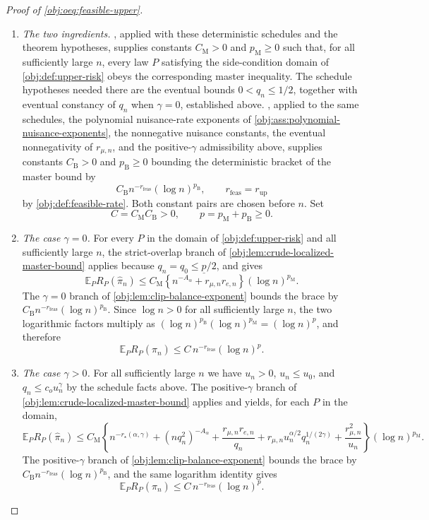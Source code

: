 \begin{proof}[Proof of \cref{obj:oeq:feasible-upper}]
\begin{enumerate}
\item \emph{The two ingredients.}  , applied with these deterministic schedules and the theorem hypotheses, supplies constants \(C_{\mathrm M}>0\) and \(p_{\mathrm M}\ge0\) such that, for all sufficiently large \(n\), every law \(P\) satisfying the side-condition domain of \cref{obj:def:upper-risk} obeys the corresponding master inequality.  The schedule hypotheses needed there are the eventual bounds \(0<q_n\le1/2\), together with eventual constancy of \(q_n\) when \(\gamma=0\), established above.  , applied to the same schedules, the polynomial nuisance-rate exponents of \cref{obj:ass:polynomial-nuisance-exponents}, the nonnegative nuisance constants, the eventual nonnegativity of \(r_{\mu,n}\), and the positive-\(\gamma\) admissibility above, supplies constants \(C_{\mathrm B}>0\) and \(p_{\mathrm B}\ge0\) bounding the deterministic bracket of the master bound by
\[
C_{\mathrm B}n^{-r_{\mathrm{feas}}}(\log n)^{p_{\mathrm B}},
\qquad
r_{\mathrm{feas}}=r_{\mathrm{up}}
\]
by \cref{obj:def:feasible-rate}.  Both constant pairs are chosen before \(n\).  Set
\[
C=C_{\mathrm M}C_{\mathrm B}>0,
\qquad
p=p_{\mathrm M}+p_{\mathrm B}\ge0 .
\]

\item \emph{The case \(\gamma=0\).}  For every \(P\) in the domain of \cref{obj:def:upper-risk} and all sufficiently large \(n\), the strict-overlap branch of \cref{obj:lem:crude-localized-master-bound} applies because \(q_n=q_0\le\underline p/2\), and gives
\[
\mathbb E_P R_P(\widehat\pi_n)
\le
C_{\mathrm M}\left\{n^{-A_\alpha}+r_{\mu,n}r_{e,n}\right\}(\log n)^{p_{\mathrm M}} .
\]
The \(\gamma=0\) branch of \cref{obj:lem:clip-balance-exponent} bounds the brace by \(C_{\mathrm B}n^{-r_{\mathrm{feas}}}(\log n)^{p_{\mathrm B}}\).  Since \(\log n>0\) for all sufficiently large \(n\), the two logarithmic factors multiply as \((\log n)^{p_{\mathrm B}}(\log n)^{p_{\mathrm M}}=(\log n)^{p}\), and therefore
\[
\mathbb E_P R_P(\widehat\pi_n)
\le
C\,n^{-r_{\mathrm{feas}}}(\log n)^{p} .
\]

\item \emph{The case \(\gamma>0\).}  For all sufficiently large \(n\) we have \(u_n>0\), \(u_n\le u_0\), and \(q_n\le c_ou_n^\gamma\) by the schedule facts above.  The positive-\(\gamma\) branch of \cref{obj:lem:crude-localized-master-bound} applies and yields, for each \(P\) in the domain,
\[
\mathbb E_P R_P(\widehat\pi_n)
\le
C_{\mathrm M}
\left\{
n^{-r_\star(\alpha,\gamma)}
+(nq_n^2)^{-A_\alpha}
+\frac{r_{\mu,n}r_{e,n}}{q_n}
+r_{\mu,n}u_n^{\alpha/2}q_n^{1/(2\gamma)}
+\frac{r_{\mu,n}^2}{u_n}
\right\}
(\log n)^{p_{\mathrm M}} .
\]
The positive-\(\gamma\) branch of \cref{obj:lem:clip-balance-exponent} bounds the brace by \(C_{\mathrm B}n^{-r_{\mathrm{feas}}}(\log n)^{p_{\mathrm B}}\), and the same logarithm identity gives
\[
\mathbb E_P R_P(\widehat\pi_n)
\le
C\,n^{-r_{\mathrm{feas}}}(\log n)^{p} .
\]


\end{enumerate}
\end{proof}
